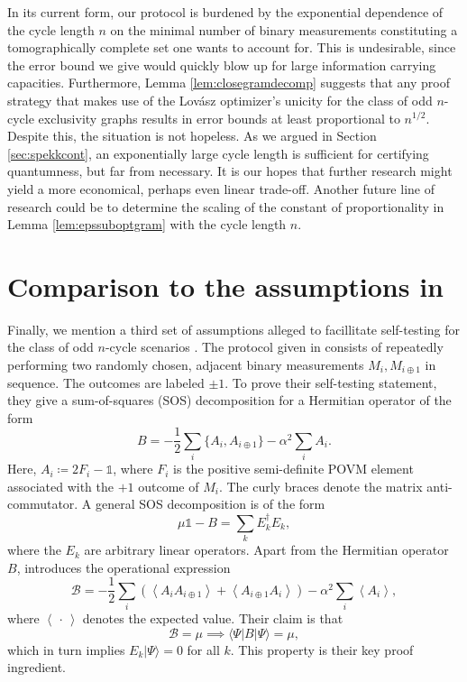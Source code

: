 In its current form, our protocol is burdened by the exponential dependence of the cycle length $n$ on the minimal number of binary measurements constituting a tomographically complete set one wants to account for. This is undesirable, since the error bound we give would quickly blow up for large information carrying capacities. Furthermore, Lemma \ref{lem:closegramdecomp} suggests that any proof strategy that makes use of the Lovász optimizer's unicity for the class of odd $n$-cycle exclusivity graphs results in error bounds at least proportional to $n^{1/2}$. Despite this, the situation is not hopeless. As we argued in Section \ref{sec:spekkcont}, an exponentially large cycle length is sufficient for certifying quantumness, but far from necessary. It is our hopes that further research might yield a more economical, perhaps even linear trade-off. Another future line of research could be to determine the scaling of the constant of proportionality in Lemma \ref{lem:epssuboptgram} with the cycle length $n$.

\section{Comparison to the assumptions in \cite{Saha2020}}

Finally, we mention a third set of assumptions alleged to facillitate self-testing for the class of odd $n$-cycle scenarios \cite{Saha2020}.
The protocol given in \cite{Saha2020} consists of repeatedly performing two randomly chosen, adjacent binary measurements $M_i, M_{i\oplus 1}$ in sequence. The outcomes are labeled $\pm 1$.
To prove their self-testing statement, they give a sum-of-squares (SOS) decomposition for a Hermitian operator of the form
\[B=-\frac{1}{2} \sum_i \{A_i, A_{i\oplus 1}\}-\alpha^2 \sum_i A_i.\] 
Here, $A_i \coloneqq 2F_i-\mathbb{1}$, where $F_i$ is the positive semi-definite POVM element associated with the $+1$ outcome of $M_i$. The curly braces denote the matrix anti-commutator.  A general SOS decomposition is of the form \[\mu\mathbb{1} - B = \sum_k E_k^{\dag}E_k,\]
where the $E_k$ are arbitrary linear operators. Apart from the Hermitian operator $B$, \cite{Saha2020} introduces the operational expression
\[\mathcal{B}=-\frac{1}{2}\sum_i \left(\left<A_i A_{i\oplus 1}\right> + \left<A_{i\oplus 1}A_i\right>\right)-\alpha^2\sum_i \left<A_i\right>,\]
where $\left<\,\cdot\,\right>$ denotes the expected value. Their claim is that 
\begin{equation}
\label{eq:falseimplication}
\mathcal{B}=\mu \implies \langle \Psi \vert B \vert \Psi \rangle = \mu,
\end{equation}
which in turn implies $E_k\vert \Psi \rangle=0$ for all $k$. This property is their key proof ingredient.

